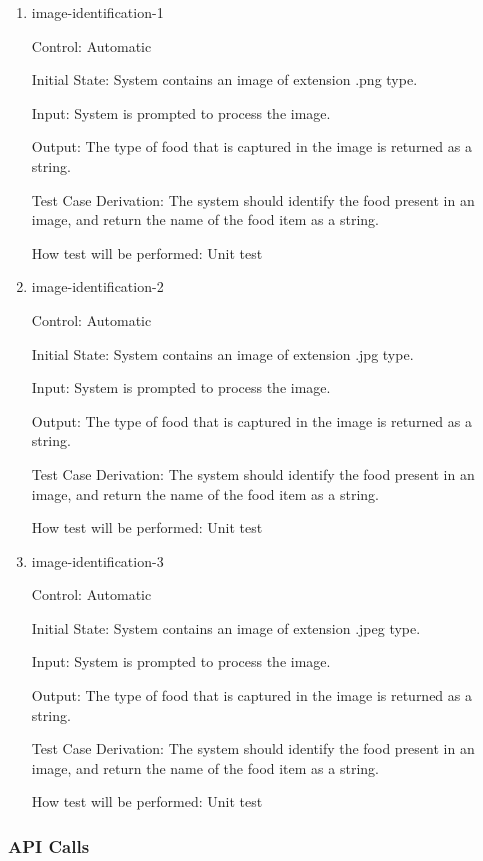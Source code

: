 \documentclass[12pt, titlepage]{article}
\begin{document}
\begin{enumerate}
	
	\item{image-identification-1\\}
	
	Control: Automatic
	
	Initial State: System contains an image of extension .png type.
	
	Input: System is prompted to process the image.
	
	Output: The type of food that is captured in the image is returned as a string.
	
	Test Case Derivation: The system should identify the food present in an image, and return the name of the food item as a string.
	
	How test will be performed: Unit test
	
	\item{image-identification-2\\}

	Control: Automatic
	
	Initial State: System contains an image of extension .jpg type.
	
	Input: System is prompted to process the image.
	
	Output: The type of food that is captured in the image is returned as a string.
	
	Test Case Derivation: The system should identify the food present in an image, and return the name of the food item as a string.
	
	How test will be performed: Unit test
	
	\item{image-identification-3\\}
	
	Control: Automatic
	
	Initial State: System contains an image of extension .jpeg type.
	
	Input: System is prompted to process the image.
	
	Output: The type of food that is captured in the image is returned as a string.
	
	Test Case Derivation: The system should identify the food present in an image, and return the name of the food item as a string.
	
	How test will be performed: Unit test
	
\end{enumerate}

\subsubsection{API Calls}
\end{document}
